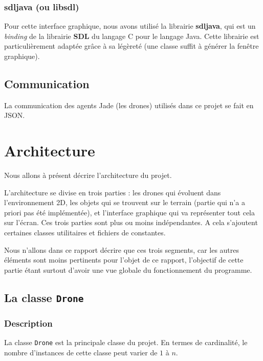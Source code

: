\documentclass[11pt]{report}
\begin{document}
\clearpage

\subsubsection{sdljava (ou libsdl)}

Pour cette interface graphique, nous avons utilisé la librairie \textbf{sdljava}, qui est un \textit{binding} de la librairie \textbf{SDL} du langage C pour le langage Java. Cette librairie est particulièrement adaptée grâce à sa légèreté (une classe suffit à générer la fenêtre graphique).

\subsection{Communication}

La communication des agents Jade (les drones) utilisés dans ce projet se fait en JSON.

\section{Architecture}

Nous allons à présent décrire l'architecture du projet.

L'architecture se divise en trois parties : les drones qui évoluent dans l'environnement 2D, les objets qui se trouvent sur le terrain (partie qui n'a a priori pas été implémentée), et l'interface graphique qui va représenter tout cela sur l'écran. Ces trois parties sont plus ou moins indépendantes. A cela s'ajoutent certaines classes utilitaires et fichiers de constantes. 

Nous n'allons dans ce rapport décrire que ces trois segments, car les autres éléments sont moins pertinents pour l'objet de ce rapport, l'objectif de cette partie étant surtout d'avoir une vue globale du fonctionnement du programme.

\subsection{La classe \protect\Verb+Drone+}

\subsubsection{Description}

La classe \verb|Drone| est la principale classe du projet. En termes de cardinalité, le nombre d'instances de cette classe peut varier de $1$ à $n$.
\end{document}
